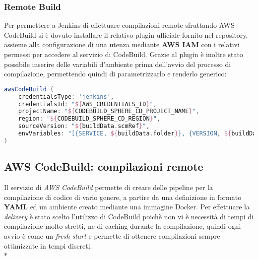 \documentclass[../main.tex]{subfiles}
\begin{document}
                \subsubsection{Remote Build}
        	   
        	        Per permettere a Jenkins di effettuare compilazioni remote sfruttando AWS CodeBuild si è dovuto installare il relativo plugin ufficiale fornito nel repository, assieme alla configurazione di una utenza mediante \textbf{AWS IAM} con i relativi permessi per accedere al servizio di CodeBuild. Grazie al plugin è inoltre stato possibile inserire delle variabili d'ambiente prima dell'avvio del processo di compilazione, permettendo quindi di parametrizzarlo e renderlo generico:
        	        \begin{lstlisting}[language=Groovy]
awsCodeBuild (
    credentialsType: 'jenkins',
    credentialsId: "${AWS_CREDENTIALS_ID}",
    projectName: "${CODEBUILD_SPHERE_CD_PROJECT_NAME}",
    region: "${CODEBUILD_SPHERE_CD_REGION}",
    sourceVersion: "${buildData.scmRef}",
    envVariables: "[{SERVICE, ${buildData.folder}}, {VERSION, ${buildData.version}}, {TARGET, ${buildData.target}}, {IMAGE_NAME, ${buildData.image}}]"
)
        	        \end{lstlisting}
        	
        	\subsection{AWS CodeBuild: compilazioni remote}
        	
        	    Il servizio di \emph{AWS CodeBuild} permette di creare delle pipeline per la compilazione di codice di vario genere, a partire da una definizione in formato \textbf{YAML} ed un ambiente creato mediante una immagine Docker. Per effettuare la \emph{delivery} è stato scelto l'utilizzo di CodeBuild poichè non vi è necessità di tempi di compilazione molto stretti, ne di caching durante la compilazione, quindi ogni avvio è come un \emph{fresh start} e permette di ottenere compilazioni sempre ottimizzate in tempi discreti.\\*
        	    
\end{document}
